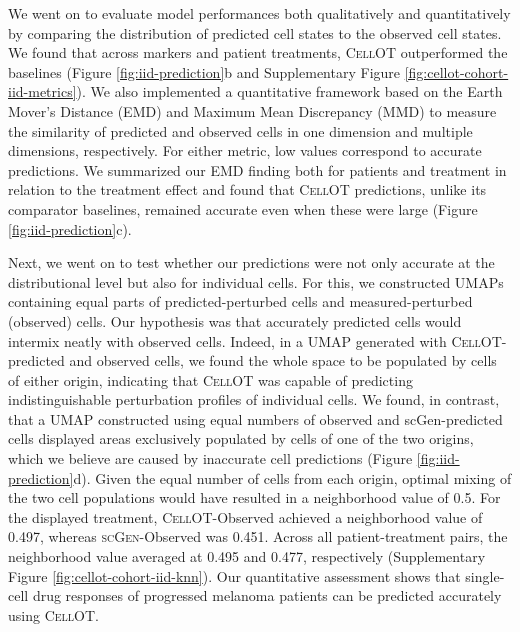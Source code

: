 We went on to evaluate model performances both qualitatively and quantitatively by comparing the distribution of predicted cell states to the observed cell states.
We found that across markers and patient treatments, \textsc{CellOT} outperformed the baselines (Figure \ref{fig:iid-prediction}b and Supplementary Figure \ref{fig:cellot-cohort-iid-metrics}).
We also implemented a quantitative framework based on the Earth Mover’s Distance (EMD) \cite{villani2009} and Maximum Mean Discrepancy (MMD) \cite{gretton2012} to measure the similarity of predicted and observed cells in one dimension and multiple dimensions, respectively.
For either metric, low values correspond to accurate predictions.
We summarized our EMD finding both for patients and treatment in relation to the treatment effect and found that \textsc{CellOT} predictions, unlike its comparator baselines, remained accurate even when these were large (Figure \ref{fig:iid-prediction}c).  

Next, we went on to test whether our predictions were not only accurate at the distributional level but also for individual cells.
For this, we constructed UMAPs containing equal parts of predicted-perturbed cells and measured-perturbed (observed) cells.
Our hypothesis was that accurately predicted cells would intermix neatly with observed cells.
Indeed, in a UMAP generated with \textsc{CellOT}-predicted and observed cells, we found the whole space to be populated by cells of either origin, indicating that \textsc{CellOT} was capable of predicting indistinguishable perturbation profiles of individual cells.
We found, in contrast, that a UMAP constructed using equal numbers of observed and scGen-predicted cells displayed areas exclusively populated by cells of one of the two origins, which we believe are caused by inaccurate cell predictions (Figure \ref{fig:iid-prediction}d).
Given the equal number of cells from each origin, optimal mixing of the two cell populations would have resulted in a neighborhood value of 0.5. For the displayed treatment, \textsc{CellOT}-Observed achieved a neighborhood value of 0.497, whereas \textsc{scGen}-Observed was 0.451.
Across all patient-treatment pairs, the neighborhood value averaged at 0.495 and 0.477, respectively (Supplementary Figure \ref{fig:cellot-cohort-iid-knn}).
Our quantitative assessment shows that single-cell drug responses of progressed melanoma patients can be predicted accurately using \textsc{CellOT}. 


